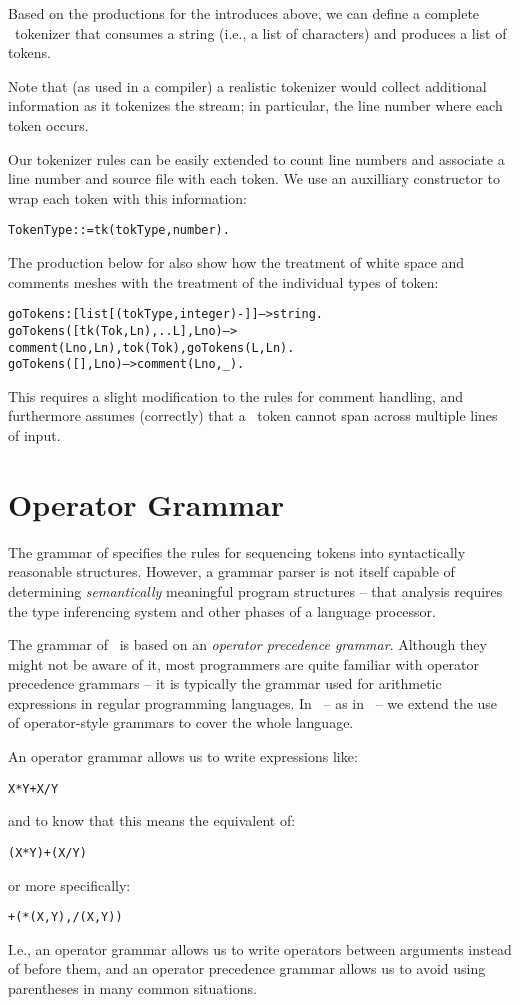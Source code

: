 Based on the productions for the  introduces above, we can define a complete \go\ tokenizer that consumes a string (i.e., a list of characters) and produces a list of tokens.

Note that (as used in a compiler) a realistic tokenizer would collect additional information as it tokenizes the stream; in particular, the line number where each token occurs.

Our tokenizer rules can be easily extended to count line numbers and associate a line number and source file with each token. We use an auxilliary constructor to wrap each token with this information:
\begin{alltt}
TokenType ::= tk(tokType,number).
\end{alltt}
The production below for  also show how the treatment of white space and comments meshes with the treatment of the individual types of token:
\begin{alltt}
goTokens:[list[(tokType,integer)-]]-->string.
goTokens([tk(Tok,Ln),..L],Lno) -->
    comment(Lno,Ln), tok(Tok), goTokens(L,Ln).
goTokens([],Lno) --> comment(Lno,_).
\end{alltt}

This requires a slight modification to the rules for comment handling, and furthermore assumes (correctly) that a \go\ token cannot span across multiple lines of input.

\section{Operator Grammar}
\label{parser:grammar}
The grammar of \go specifies the rules for sequencing tokens into syntactically reasonable structures. However, a grammar parser is not itself capable of determining \emph{semantically} meaningful program structures -- that analysis requires the type inferencing system and other phases of a language processor.

The grammar of \go\ is based on an \emph{operator precedence grammar}. Although they might not be aware of it, most programmers are quite familiar with operator precedence grammars -- it is typically the grammar used for arithmetic expressions in regular programming languages. In \go\ -- as in \prolog\ -- we extend the use of operator-style grammars to cover the whole language.

An operator grammar allows us to write expressions like:
\begin{alltt}
X * Y + X / Y
\end{alltt}
and to know that this means the equivalent of:
\begin{alltt}
(X * Y) + (X / Y)
\end{alltt}
or more specifically:
\begin{alltt}
+(*(X, Y), /(X, Y))
\end{alltt}
I.e., an operator grammar allows us to write operators between arguments instead of before them, and an operator precedence grammar allows us to avoid using parentheses in many common situations.

